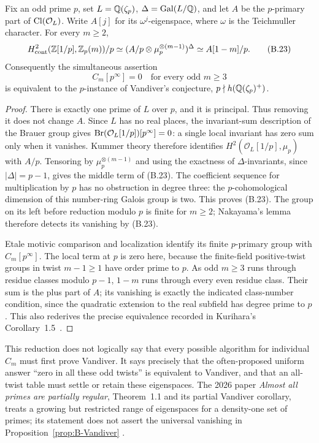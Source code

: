 \begin{proposition}
\label{prop:B-Vandiver}
Fix an odd prime \(p\), set \(L=\mathbb Q(\zeta_p)\),
\(\Delta=\operatorname{Gal}(L/\mathbb Q)\), and let \(A\) be the \(p\)-primary
part of \(\operatorname{Cl}(\mathcal O_L)\).  Write \(A[j]\) for its
\(\omega^j\)-eigenspace, where \(\omega\) is the Teichmuller
character.  For every \(m\ge2\),
\[
 H^2_{\mathrm{cont}}(\mathbb Z[1/p],\mathbb Z_p(m))/p
 \simeq (A/p\otimes\mu_p^{\otimes(m-1)})^\Delta
 \simeq A[1-m]/p.\tag{B.23}
\]
Consequently the simultaneous assertion
\[
 C_m[p^\infty]=0\quad\text{for every odd }m\ge3
\]
is equivalent to the \(p\)-instance of Vandiver's conjecture,
\(p\nmid h(\mathbb Q(\zeta_p)^+)\).
\end{proposition}
\begin{proof}
There is exactly one prime of \(L\) over \(p\), and it is
principal.  Thus removing it does not change \(A\).  Since \(L\)
has no real places, the invariant-sum description of the Brauer group
gives \(\operatorname{Br}(\mathcal O_L[1/p])[p^\infty]=0\): a single
local invariant has zero sum only when it vanishes.  Kummer theory
therefore identifies
\(H^2(\mathcal O_L[1/p],\mu_p)\) with \(A/p\).
Tensoring by \(\mu_p^{\otimes(m-1)}\) and using the exactness
of \(\Delta\)-invariants, since \(|\Delta|=p-1\), gives the
middle term of (B.23).  The coefficient sequence for multiplication
by \(p\) has no obstruction in degree three: the \(p\)-cohomological
dimension of this number-ring Galois group is two.  This proves
(B.23).  The group on its left before reduction modulo \(p\) is
finite for \(m\ge2\); Nakayama's lemma therefore detects its
vanishing by (B.23).

Etale motivic comparison and localization identify its finite
\(p\)-primary group with \(C_m[p^\infty]\).  The local term at
\(p\) is zero here, because the finite-field positive-twist groups
in twist \(m-1\ge1\) have order prime to \(p\).  As odd
\(m\ge3\) runs through residue classes modulo \(p-1\),
\(1-m\) runs through every even residue class.  Their sum is the
plus part of \(A\); its vanishing is exactly the indicated
class-number condition, since the quadratic extension to the real
subfield has degree prime to \(p\).  This also rederives the precise
equivalence recorded in Kurihara's Corollary~1.5~\cite{BKurihara1992}.
\end{proof}

This reduction does not logically say that every possible algorithm
for individual \(C_m\) must first prove Vandiver.  It says precisely
that the often-proposed uniform answer ``zero in all these odd
twists'' is equivalent to Vandiver, and that an all-twist table must
settle or retain these eigenspaces.  The 2026 paper \emph{Almost all
primes are partially regular}, Theorem~1.1 and its partial Vandiver
corollary, treats a growing but restricted range of eigenspaces for
a density-one set of primes; its statement does not assert the
universal vanishing in Proposition~\ref{prop:B-Vandiver}
\cite[Theorem~1.1 and Corollary~1.4]{BChen2026}.

